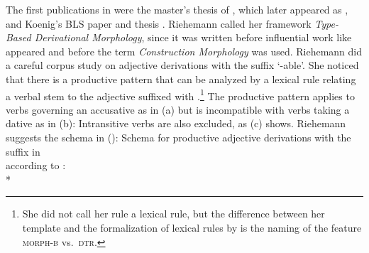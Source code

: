 \documentclass[output=paper
	        ,collection
	        ,collectionchapter
 	        ,biblatex
                ,babelshorthands
                ,newtxmath
                ,draftmode
                ,colorlinks, citecolor=brown
]{langscibook}
\begin{document}
The first publications in  were the
master's thesis of \citet{Riehemann93a}, which later appeared as \citet{Riehemann98a}, and Koenig's BLS paper and thesis
\citep{Koenig93a-u,Koenig94a-u,Koenig99a}. Riehemann called her framework \emph{Type-Based Derivational
  Morphology}, since it was written before influential work like  
appeared and before the term \emph{Construction Morphology} \citep{Booij2005a} was used. Riehemann did a careful corpus study on adjective
derivations with the suffix  `-able'. She noticed that there is a productive pattern
that can be analyzed by a lexical rule relating a verbal stem to the adjective suffixed with
.\footnote{
  She did not call her rule a lexical rule, but the difference between her template and the
  formalization of lexical rules by \citet{Meurers2001a} is the naming of the feature \textsc{morph-b}
  vs.\ \textsc{dtr}.
} The productive pattern applies to verbs governing an accusative as in (a) but
is incompatible with verbs taking a dative as in (b):
\eal
{}
\zl
Intransitive verbs are also excluded, as (c) shows. Riehemann suggests the schema in
():
\ea
\label{ex-schema-bar}
Schema for productive adjective derivations with the suffix  in\\  according to
\citet[]{Riehemann98a}:\\*
\end{document}
